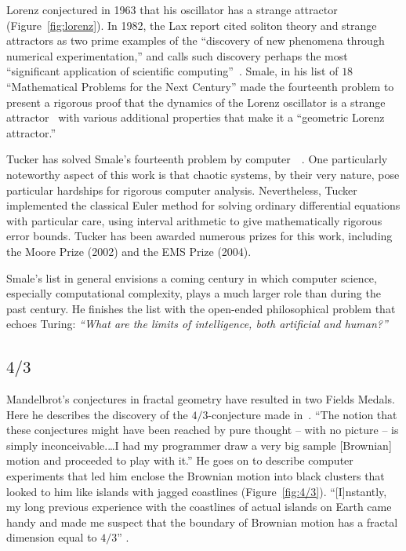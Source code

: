 \documentclass{llncs}
\begin{document}
Lorenz conjectured in 1963 that his oscillator has a strange attractor
(Figure~\ref{fig:lorenz}).  In 1982, the Lax report cited soliton
theory and strange attractors as two prime examples of the ``discovery
of new phenomena through numerical experimentation,'' and calls such
discovery perhaps the most ``significant application of scientific
computing''~\cite{Lax}.  Smale, in his list of $18$ ``Mathematical
Problems for the Next Century'' made the fourteenth problem to present
a rigorous proof that the dynamics of the Lorenz oscillator is a
strange attractor~\cite{Sma98} with various additional properties that
make it a ``geometric Lorenz attractor.''

Tucker has solved Smale's fourteenth problem by
computer~\cite{Tuc02}~\cite{St00}.  One particularly noteworthy aspect
of this work is that chaotic systems, by their very nature, pose
particular hardships for rigorous computer analysis.  Nevertheless,
Tucker implemented the classical Euler method for solving ordinary
differential equations with particular care,  using interval
arithmetic to give mathematically rigorous error bounds.  Tucker has
been awarded numerous prizes for this work, including the Moore Prize
(2002) and the EMS Prize (2004).

Smale's list in general envisions a coming century in which computer
science, especially computational complexity, plays a much larger
role than during the past century. He finishes the list with the
open-ended philosophical problem  that echoes Turing: {\it
  ``What are the limits of intelligence, both artificial and human?''}


\subsection{$4/3$}
Mandelbrot's conjectures in fractal geometry have resulted in two
Fields Medals.  Here he describes the discovery of the
$4/3$-conjecture made in~\cite{ManFN}.  ``The notion that these
conjectures might have been reached by pure thought -- with no picture
-- is simply inconceivable.\dots I had my programmer draw a very big
sample [Brownian] motion and proceeded to play with it.''  He goes on
to describe computer experiments that led him enclose the Brownian
motion into black clusters that looked to him like islands with jagged
coastlines (Figure~\ref{fig:4/3}).
``[I]nstantly, my long previous experience with the coastlines of
  actual islands on Earth came handy and made me suspect that the
  boundary of Brownian motion has a fractal dimension equal to $4/3$''
\cite{Man}.
\end{document}
